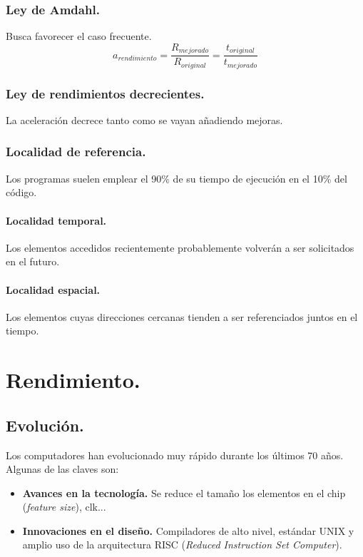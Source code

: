 \documentclass{article}
\begin{document}
\begin{multicols}{2}
		\subsubsection{Ley de Amdahl.} 
		Busca favorecer el caso frecuente.
		\begin{displaymath}
			a_{rendimiento} = \frac {R_{mejorado}} {R_{original}} =  \frac {t_{original}} {t_{mejorado}} 
		\end{displaymath}
		
		\subsubsection{Ley de rendimientos decrecientes.}
		La aceleración decrece tanto como se vayan añadiendo mejoras.
		
		\subsubsection{Localidad de referencia.}
		Los programas suelen emplear el 90\% de su tiempo de ejecución en el 10\% del código.
		
		\paragraph{Localidad temporal.} Los elementos accedidos recientemente probablemente volverán a ser solicitados en el futuro.
		
		\paragraph{Localidad espacial.} Los elementos cuyas direcciones cercanas tienden a ser referenciados juntos en el tiempo.
		
		\section{Rendimiento.}
		\subsection{Evolución.}
		Los computadores han evolucionado muy rápido durante los últimos 70 años. Algunas de las claves son:
		
		\begin{itemize}
			\item \textbf{Avances en la tecnología.} Se reduce el tamaño los elementos en el chip (\textit{feature size}), clk...
			\item \textbf{Innovaciones en el diseño.} Compiladores de alto nivel, estándar UNIX y amplio uso de la arquitectura RISC (\textit{Reduced Instruction Set Computer}).
		\end{itemize}


\end{multicols}
\end{document}
